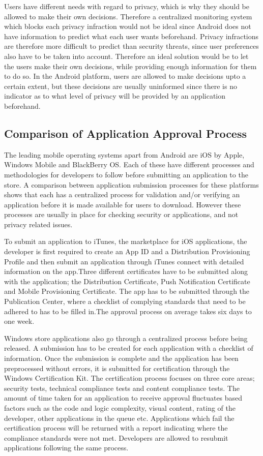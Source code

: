 Users have different needs with regard to privacy, which is why they should be allowed to make their own decisions. Therefore a centralized monitoring system which blocks each privacy infraction would not be ideal since Android does not have information to predict what each user wants beforehand. Privacy infractions are therefore more difficult to predict than security threats, since user preferences also have to be taken into account. Therefore an ideal solution would be to let the users make their own decisions, while providing enough information for them to do so. In the Android platform, users are allowed to make decisions upto a certain extent, but these decisions are usually uninformed since there is no indicator as to what level of privacy will be provided by an application beforehand.

\subsection{Comparison of Application Approval Process}

The leading mobile operating systems apart from Android are iOS by Apple, Windows Mobile and BlackBerry OS. Each of these have different processes and methodologies for developers to follow before submitting an application to the store. A comparison between application submission processes for these platforms shows that each has a centralized process for validation and/or verifying an application before it is made available for users to download. However these processes are usually in place for checking security or applications, and not privacy related issues. 
\smallskip

To submit an application to iTunes, the marketplace for iOS applications, the developer is first required to create an App ID and a Distribution Provisioning Profile and then  submit an application through iTunes connect with detailed information on the app.Three different certificates have to be submitted along with the application; the Distribution Certificate, Push Notification Certificate and Mobile Provisioning Certificate. The app has to be submitted through the Publication Center, where a checklist of complying standards that need to be adhered to has to be filled in.The approval process on average takes six days to one week.\cite{e}
\smallskip

Windows store applications also go through a centralized process before being released. A submission has to be created for each application with a checklist of information. Once the submission is complete and the application has been preprocessed without errors, it is submitted for certification through the Windows Certification Kit. The certification process focuses on three core areas; security tests, technical compliance tests and content compliance tests. The amount of time taken for an application to receive approval fluctuates based factors such as the code and logic complexity, visual content, rating of the developer, other applications in the queue etc. Applications which fail the certification process will be returned with a report indicating where the compliance standards were not met. Developers are allowed to resubmit applications following the same process.\cite{f}
\smallskip

